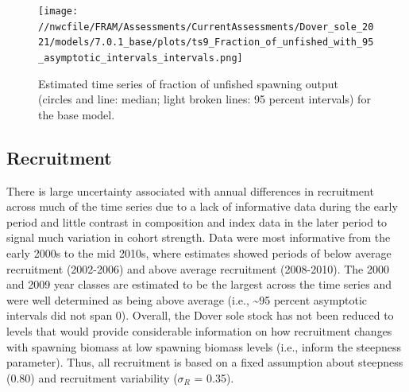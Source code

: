\documentclass[11pt,
  english,
  a4paper,
]{article}
\begin{document}
\begin{figure}
\centering
\texttt{[image: //nwcfile/FRAM/Assessments/CurrentAssessments/Dover\_sole\_2021/models/7.0.1\_base/plots/ts9\_Fraction\_of\_unfished\_with\_95\_asymptotic\_intervals\_intervals.png]}
\caption{Estimated time series of fraction of unfished spawning output (circles and line: median; light broken lines: 95 percent intervals) for the base model.\label{fig:es-depl}}
\end{figure}

\tagmcend\tagstructend

\clearpage


\hypertarget{recruitment}{%
\subsection*{Recruitment}\label{recruitment}}

\leavevmode\tagmcend\tagstructend


There is large uncertainty associated with annual differences in recruitment across much of the time series due to a lack of informative data during the early period and little contrast in composition and index data in the later period to signal much variation in cohort strength. Data were most informative from the early 2000s to the mid 2010s, where estimates showed periods of below average recruitment (2002-2006) and above average recruitment (2008-2010). The 2000 and 2009 year classes are estimated to be the largest across the time series and were well determined as being above average (i.e., \textasciitilde95 percent asymptotic intervals did not span 0). Overall, the Dover sole stock has not been reduced to levels that would provide considerable information on how recruitment changes with spawning biomass at low spawning biomass levels (i.e., inform the steepness parameter). Thus, all recruitment is based on a fixed assumption about steepness (0.80) and recruitment variability ({\(\sigma_R\)\leavevmode\tagmcend\tagstructend} = 0.35).

\leavevmode\tagmcend\tagstructend\par



\end{document}
